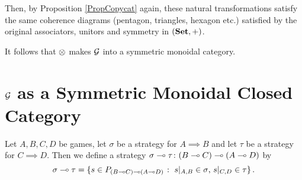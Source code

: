 \documentclass[11pt]{report}
\begin{document}
Then, by Proposition \ref{PropCopycat} again, these natural transformations satisfy the same coherence diagrams (pentagon, triangles, hexagon etc.) satisfied by the original associators, unitors and symmetry in $({\normalfont\textbf{Set}},+)$.  

It follows that $\otimes$ makes $\mathcal G$ into a symmetric monoidal category.

\section{$\mathcal G$ as a Symmetric Monoidal Closed Category}

\begin{definition}
  Let $A,B,C,D$ be games, let $\sigma$ be a strategy for $A\implies B$ and let $\tau$ be a strategy for $C\implies D$.  
  Then we define a strategy $\sigma\multimap \tau\colon (B\multimap C) \multimap (A\multimap D)$ by
  \[
    \sigma\multimap \tau = \{s\in P_{(B\multimap C) \multimap (A \multimap D)}\;\colon\; \text{$s\vert_{A,B}\in\sigma$, $s\vert_{C,D}\in\tau$}\}\,.
    \]
\end{definition}
\end{document}
